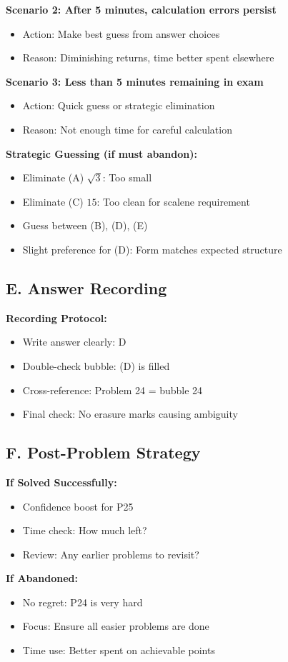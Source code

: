 \documentclass[12pt]{article}
\begin{document}
\begin{competitionbox}
\textbf{Scenario 2: After 5 minutes, calculation errors persist}
\begin{itemize}
    \item Action: Make best guess from answer choices
    \item Reason: Diminishing returns, time better spent elsewhere
\end{itemize}

\textbf{Scenario 3: Less than 5 minutes remaining in exam}
\begin{itemize}
    \item Action: Quick guess or strategic elimination
    \item Reason: Not enough time for careful calculation
\end{itemize}

\textbf{Strategic Guessing (if must abandon):}
\begin{itemize}
    \item Eliminate (A) $\sqrt{3}$: Too small
    \item Eliminate (C) $15$: Too clean for scalene requirement
    \item Guess between (B), (D), (E)
    \item Slight preference for (D): Form matches expected structure
\end{itemize}

\subsection*{E. Answer Recording}

\textbf{Recording Protocol:}
\begin{itemize}
    \item Write answer clearly: D
    \item Double-check bubble: (D) is filled
    \item Cross-reference: Problem 24 = bubble 24
    \item Final check: No erasure marks causing ambiguity
\end{itemize}

\subsection*{F. Post-Problem Strategy}

\textbf{If Solved Successfully:}
\begin{itemize}
    \item Confidence boost for P25
    \item Time check: How much left?
    \item Review: Any earlier problems to revisit?
\end{itemize}

\textbf{If Abandoned:}
\begin{itemize}
    \item No regret: P24 is very hard
    \item Focus: Ensure all easier problems are done
    \item Time use: Better spent on achievable points
\end{itemize}

\end{competitionbox}
\end{document}
